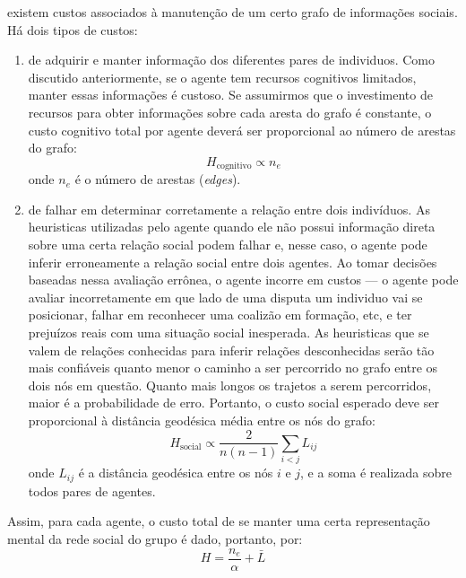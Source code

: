  existem custos associados à manutenção de um certo grafo de informações sociais. Há dois tipos de custos:  
\begin{enumerate}

\item {} de adquirir e manter informação dos diferentes pares de individuos. Como discutido anteriormente, se o agente tem recursos cognitivos limitados, manter essas informações é custoso. Se assumirmos que o investimento de recursos para obter informações sobre cada aresta do grafo é constante, o custo cognitivo total por agente deverá ser proporcional ao número de arestas do grafo:
\begin{equation}
   H_{\text{cognitivo}} \propto n_{e}
\end{equation}
onde $n_{e}$ é o número de arestas (\emph{edges}).

\item {} de falhar em determinar corretamente a relação entre dois indivíduos. As heuristicas utilizadas pelo agente quando ele não possui informação direta sobre uma certa relação social podem falhar e, nesse caso, o agente pode inferir erroneamente a relação social entre dois agentes. Ao  tomar decisões baseadas nessa avaliação errônea, o agente incorre em custos --- o agente pode avaliar incorretamente em que lado de uma disputa um individuo vai se posicionar, falhar em reconhecer uma coalizão em formação, etc, e ter prejuízos reais com uma situação social inesperada. As heuristicas que se valem de relações conhecidas para inferir relações desconhecidas serão tão mais confiáveis quanto menor o caminho a ser percorrido no grafo entre os dois nós em questão. Quanto mais longos os trajetos a serem percorridos, maior é a probabilidade de erro. Portanto, o custo social esperado deve ser proporcional à distância geodésica média entre os nós do grafo:
\begin{equation}
 H_{\text{social}} \propto \frac{2}{n(n-1)} \sum_{i<j}{L_{ij}}
\end{equation}
onde $L_{ij}$ é a distância geodésica entre os nós $i$ e $j$, e a soma é realizada sobre todos pares de agentes. 

\end{enumerate}
Assim, para cada agente, o custo total de se manter uma certa representação mental da rede social do grupo é dado, portanto, por:
\begin{equation}
   \label{eq:hamiltoniano}
   H = \frac{n_{e}}{\alpha}  + \bar{L}
\end{equation}
